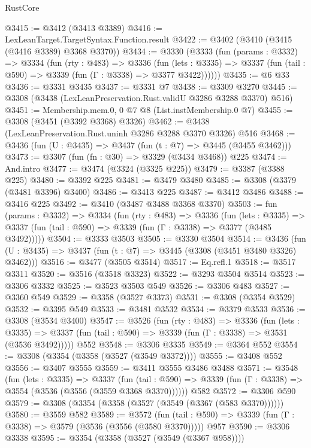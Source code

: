 \begin{lexlean}{RustCore}
\begin{coremodule}
@3415 := @3412 (@3413 @3389)
@3416 := LexLeanTarget.TargetSyntax.Function.result
@3422 := @3402 (@3410 (@3415 (@3416 @3389) @3368 @3370))
@3434 := @3330
    (@3333
      (fun (params : @3332) =>
      @3334
        (fun (rty : @483) =>
        @3336
          (fun (lets : @3335) =>
          @3337 (fun (tail : @590) => @3339 (fun (Γ : @3338) => @3377 @3422))))))
@3435 := @6 @33
@3436 := @3331 @3435
@3437 := @3331 @7
@3438 := @3309 @3270
@3445 := @3308 (@3438 (LexLeanPreservation.Rust.validU @3286 @3288 @3370) @516)
@3451 := Membership.mem.{0, 0} @7 @8 (List.instMembership.{0} @7)
@3455 := @3308 (@3451 (@3392 @3368) @3326)
@3462 := @3438 (LexLeanPreservation.Rust.uninh @3286 @3288 @3370 @3326) @516
@3468 := @3436 (fun (U : @3435) => @3437 (fun (t : @7) => @3445 (@3455 @3462)))
@3473 := @3307 (fun (fn : @30) => @3329 (@3434 @3468)) @225
@3474 := And.intro
@3477 := @3474 (@3324 (@3325 @225))
@3479 := @3387 (@3388 @225)
@3480 := @3392 @225
@3481 := @3479 @3480
@3485 := @3308 (@3379 (@3481 @3396) @3400)
@3486 := @3413 @225
@3487 := @3412 @3486
@3488 := @3416 @225
@3492 := @3410 (@3487 @3488 @3368 @3370)
@3503 := fun (params : @3332) =>
  @3334
    (fun (rty : @483) =>
    @3336
      (fun (lets : @3335) =>
      @3337 (fun (tail : @590) => @3339 (fun (Γ : @3338) => @3377 (@3485 @3492)))))
@3504 := @3333 @3503
@3505 := @3330 @3504
@3514 := @3436 (fun (U : @3435) => @3437 (fun (t : @7) => @3445 (@3308 (@3451 @3480 @3326) @3462)))
@3516 := @3477 (@3505 @3514)
@3517 := Eq.refl.{1}
@3518 := @3517 @3311
@3520 := @3516 (@3518 @3323)
@3522 := @3293 @3504 @3514
@3523 := @3306 @3332
@3525 := @3523 @3503 @549
@3526 := @3306 @483
@3527 := @3360 @549
@3529 := @3358 (@3527 @3373)
@3531 := @3308 (@3354 @3529)
@3532 := @3395 @549
@3533 := @3481 @3532
@3534 := @3379 @3533
@3536 := @3308 (@3534 @3400)
@3547 := @3526
    (fun (rty : @483) =>
    @3336
      (fun (lets : @3335) =>
      @3337 (fun (tail : @590) => @3339 (fun (Γ : @3338) => @3531 (@3536 @3492)))))
    @552
@3548 := @3306 @3335
@3549 := @3364 @552
@3554 := @3308 (@3354 (@3358 (@3527 (@3549 @3372))))
@3555 := @3408 @552
@3556 := @3407 @3555
@3559 := @3411 @3555 @3486 @3488
@3571 := @3548
    (fun (lets : @3335) =>
    @3337
      (fun (tail : @590) => @3339 (fun (Γ : @3338) => @3554 (@3536 (@3556 (@3559 @3368 @3370))))))
    @582
@3572 := @3306 @590
@3579 := @3308 (@3354 (@3358 (@3527 (@3549 (@3367 (@583 @3370))))))
@3580 := @3559 @582
@3589 := @3572
    (fun (tail : @590) => @3339 (fun (Γ : @3338) => @3579 (@3536 (@3556 (@3580 @3370)))))
    @957
@3590 := @3306 @3338
@3595 := @3354 (@3358 (@3527 (@3549 (@3367 @958))))

\end{coremodule}
\end{lexlean}
